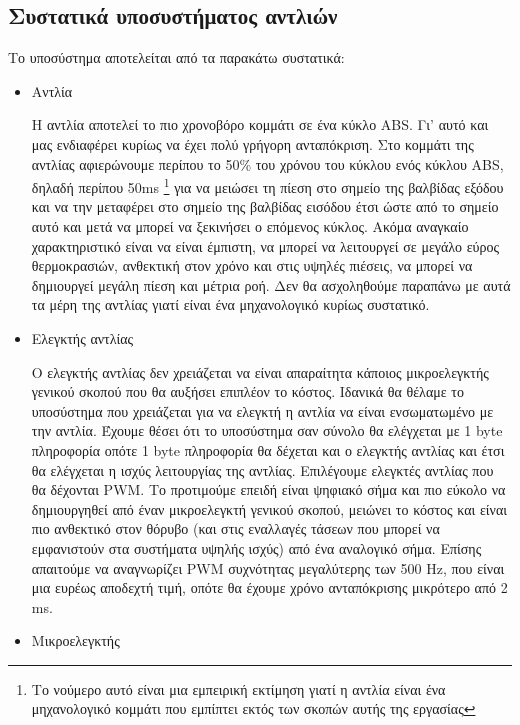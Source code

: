 \documentclass{article}
\begin{document}
\subsection{Συστατικά υποσυστήματος αντλιών}
Το υποσύστημα αποτελείται από τα παρακάτω συστατικά:
\begin{itemize}
    \item Αντλία
    \par
    H αντλία αποτελεί το πιο χρονοβόρο κομμάτι σε ένα κύκλο ABS. Γι' αυτό και μας ενδιαφέρει κυρίως να έχει πολύ γρήγορη ανταπόκριση. Στο κομμάτι της αντλίας αφιερώνουμε περίπου το 50\% του χρόνου του κύκλου ενός κύκλου ABS, δηλαδή περίπου 50ms \footnote{Το νούμερο αυτό είναι μια εμπειρική εκτίμηση γιατί η αντλία είναι ένα μηχανολογικό κομμάτι που εμπίπτει εκτός των σκοπών αυτής της εργασίας} για να μειώσει τη πίεση στο σημείο της βαλβίδας εξόδου και να την μεταφέρει στο σημείο της βαλβίδας εισόδου έτσι ώστε από το σημείο αυτό και μετά να μπορεί να ξεκινήσει ο επόμενος κύκλος. Ακόμα αναγκαίο χαρακτηριστικό είναι να είναι έμπιστη, να μπορεί να λειτουργεί σε μεγάλο εύρος θερμοκρασιών, ανθεκτική στον χρόνο και στις υψηλές πιέσεις, να μπορεί να δημιουργεί μεγάλη πίεση και μέτρια ροή. Δεν θα ασχοληθούμε παραπάνω με αυτά τα μέρη της αντλίας γιατί είναι ένα μηχανολογικό κυρίως συστατικό.
    \item Ελεγκτής αντλίας
    \par
    Ο ελεγκτής αντλίας δεν χρειάζεται να είναι απαραίτητα κάποιος μικροελεγκτής γενικού σκοπού που θα αυξήσει επιπλέον το κόστος. Ιδανικά θα θέλαμε το υποσύστημα που χρειάζεται για να ελεγκτή η αντλία να είναι ενσωματωμένο με την αντλία. Έχουμε θέσει ότι το υποσύστημα σαν σύνολο θα ελέγχεται με 1 byte πληροφορία οπότε 1 byte πληροφορία θα δέχεται και ο ελεγκτής αντλίας και έτσι θα ελέγχεται η ισχύς λειτουργίας της αντλίας. Επιλέγουμε ελεγκτές αντλίας που θα δέχονται PWM. Το προτιμούμε επειδή είναι ψηφιακό σήμα και πιο εύκολο να δημιουργηθεί από έναν μικροελεγκτή γενικού σκοπού, μειώνει το κόστος και είναι πιο ανθεκτικό στον θόρυβο (και στις εναλλαγές τάσεων που μπορεί να εμφανιστούν στα συστήματα υψηλής ισχύς) από ένα αναλογικό σήμα. Επίσης απαιτούμε να αναγνωρίζει PWM συχνότητας μεγαλύτερης των 500 Hz, που είναι μια ευρέως αποδεχτή τιμή, οπότε θα έχουμε χρόνο ανταπόκρισης μικρότερο από 2 ms.
    \item Μικροελεγκτής
    \par
\end{itemize}
\end{document}
